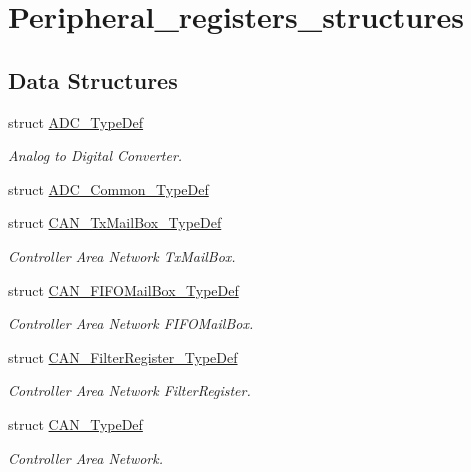 \hypertarget{group___peripheral__registers__structures}{\section{Peripheral\-\_\-registers\-\_\-structures}
\label{group___peripheral__registers__structures}
}
\subsection*{Data Structures}
\begin{DoxyCompactItemize}
\item 
struct \hyperlink{struct_a_d_c___type_def}{A\-D\-C\-\_\-\-Type\-Def}
\begin{DoxyCompactList}\small\item\em Analog to Digital Converter. \end{DoxyCompactList}\item 
struct \hyperlink{struct_a_d_c___common___type_def}{A\-D\-C\-\_\-\-Common\-\_\-\-Type\-Def}
\item 
struct \hyperlink{struct_c_a_n___tx_mail_box___type_def}{C\-A\-N\-\_\-\-Tx\-Mail\-Box\-\_\-\-Type\-Def}
\begin{DoxyCompactList}\small\item\em Controller Area Network Tx\-Mail\-Box. \end{DoxyCompactList}\item 
struct \hyperlink{struct_c_a_n___f_i_f_o_mail_box___type_def}{C\-A\-N\-\_\-\-F\-I\-F\-O\-Mail\-Box\-\_\-\-Type\-Def}
\begin{DoxyCompactList}\small\item\em Controller Area Network F\-I\-F\-O\-Mail\-Box. \end{DoxyCompactList}\item 
struct \hyperlink{struct_c_a_n___filter_register___type_def}{C\-A\-N\-\_\-\-Filter\-Register\-\_\-\-Type\-Def}
\begin{DoxyCompactList}\small\item\em Controller Area Network Filter\-Register. \end{DoxyCompactList}\item 
struct \hyperlink{struct_c_a_n___type_def}{C\-A\-N\-\_\-\-Type\-Def}
\begin{DoxyCompactList}\small\item\em Controller Area Network. \end{DoxyCompactList}\item 

\end{DoxyCompactItemize}
